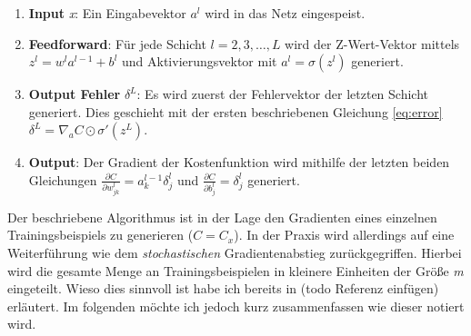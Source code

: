 \begin{enumerate}

\item \textbf{Input} \emph{x}: Ein Eingabevektor $a^l$ wird in das Netz eingespeist. 

\item \textbf{Feedforward}: Für jede Schicht $l = 2, 3, \ldots, L$ wird der Z-Wert-Vektor mittels $z^{l} = w^l a^{l-1}+b^l$ und Aktivierungsvektor mit $a^{l} = \sigma(z^{l})$ generiert. 

\item \textbf{Output Fehler} $\delta^L$: Es wird zuerst der Fehlervektor der letzten Schicht generiert. Dies geschieht mit der ersten beschriebenen Gleichung \ref{eq:error} $\delta^{L}  = \nabla_a C \odot \sigma'(z^L)$. 

\item \textbf{Output}: Der Gradient der Kostenfunktion wird mithilfe der letzten beiden Gleichungen $\frac{\partial C}{\partial w^l_{jk}} = a^{l-1}_k \delta^l_j$ und $\frac{\partial C}{\partial b^l_j} = \delta^l_j$ generiert.

\end{enumerate} 

Der beschriebene Algorithmus ist in der Lage den Gradienten eines einzelnen Trainingsbeispiels zu generieren ($C=C_x$). In der Praxis wird allerdings auf eine Weiterführung wie dem \emph{stochastischen} Gradientenabstieg zurückgegriffen. Hierbei wird die gesamte Menge an Trainingsbeispielen in kleinere Einheiten der Größe \emph{m} eingeteilt. Wieso dies sinnvoll ist habe ich bereits in (todo Referenz einfügen) erläutert. Im folgenden möchte ich jedoch kurz zusammenfassen wie dieser notiert wird. 



